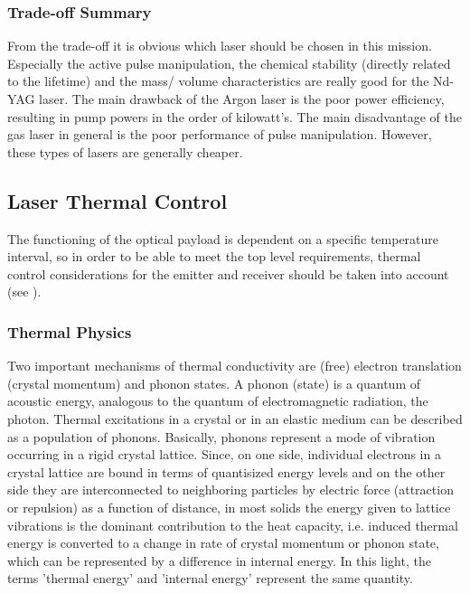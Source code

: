 	\subsubsection{Trade-off Summary}
From the trade-off it is obvious which \acs{laser} should be chosen in this mission. Especially the active pulse manipulation, the chemical stability (directly related to the lifetime) and the mass/ volume characteristics are really good for the Nd-YAG \acs{laser}. The main drawback of the Argon \acs{laser} is the poor power efficiency, resulting in pump powers in the order of kilowatt's. The main disadvantage of the gas \acs{laser} in general is the poor performance of pulse manipulation. However, these types of \acs{laser}s are generally cheaper. 
	
	\subsection{Laser Thermal Control}
	\label{mtLSRthermal}
The functioning of the optical payload is dependent on a specific temperature interval, so in order to be able to meet the top level requirements, thermal control considerations for the emitter and receiver should be taken into account (see \cite{lasertech}). 

\subsubsection{Thermal Physics}
	\label{mtLSRthermalphysics}
Two important mechanisms of thermal conductivity are (free) electron translation (crystal momentum) and phonon states. A phonon (state) is a quantum of acoustic energy, analogous to the quantum of electromagnetic radiation, the photon. Thermal excitations in a crystal or in an elastic medium can be described as a population of phonons. Basically, phonons represent a mode of vibration occurring in a rigid crystal lattice. Since, on one side, individual electrons in a crystal lattice are bound in terms of quantisized energy levels and on the other side they are interconnected to neighboring particles by electric force (attraction or repulsion) as a function of distance, in most solids the energy given to lattice vibrations is the dominant contribution to the heat capacity, i.e. induced thermal energy is converted to a change in rate of crystal momentum or phonon state, which can be represented by a difference in internal energy. In this light, the terms 'thermal energy' and 'internal energy' represent the same quantity. 

